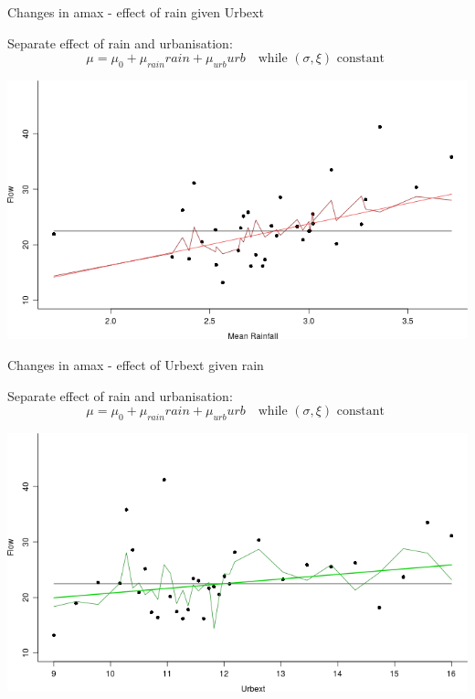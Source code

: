 \documentclass[
  10pt,
  ignorenonframetext,
  compress]{beamer}
\begin{document}
\begin{frame}{Changes in amax - effect of rain given Urbext}
\protect\hypertarget{changes-in-amax---effect-of-rain-given-urbext}{}

Separate effect of rain and urbanisation:\\
\[\mu=\mu_0 + \mu_{rain} rain + \mu_{urb} urb \quad \text{while } (\sigma, \xi)  \text{ constant }\]

\includegraphics{ProsdocimiPerugia_files/figure-beamer/rainGivenUrbRetPlot-1.png}

\end{frame}

\begin{frame}{Changes in amax - effect of Urbext given rain}
\protect\hypertarget{changes-in-amax---effect-of-urbext-given-rain}{}

Separate effect of rain and urbanisation:\\
\[\mu=\mu_0 + \mu_{rain} rain + \mu_{urb} urb \quad \text{while } (\sigma, \xi)  \text{ constant }\]

\includegraphics{ProsdocimiPerugia_files/figure-beamer/urbGivenRainRetPlot-1.png}

\end{frame}
\end{document}
